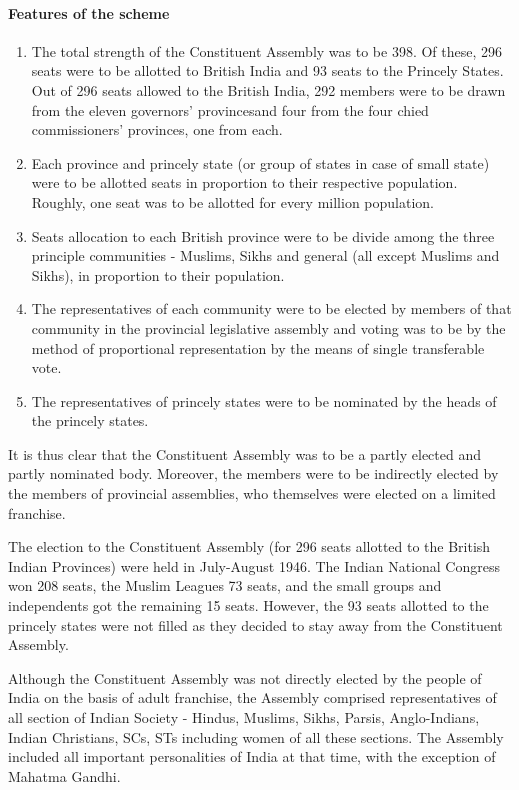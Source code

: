 \begin{multicol}{2}
\paragraph{Features of the scheme}
\begin{enumerate}
  \item The total strength of the Constituent Assembly was to be 398. Of these, 296 seats were to be allotted to British India and 93 seats to the Princely States. Out of 296 seats allowed to the British India, 292 members were to be drawn from the eleven governors' provinces\endnote and four from the four chied commissioners' provinces\endnote, one from each.
  \item Each province and princely state (or group of states in case of small state) were to be allotted seats in proportion to their respective population. Roughly, one seat was to be allotted for every million population.
  \item Seats allocation to each British province were to be divide among the three principle communities - Muslims, Sikhs and general (all except Muslims and Sikhs), in proportion to their population.
  \item The representatives of each community were to be elected by members of that community in the provincial legislative assembly and voting was to be by the method of proportional representation by the means of single transferable vote.
  \item The representatives of princely states were to be nominated by the heads of the princely states.
\end{enumerate}

It is thus clear that the Constituent Assembly was to be a partly elected and partly nominated body. Moreover, the members were to be indirectly elected by the members of provincial assemblies, who themselves were elected on a limited franchise\endnote.

The election to the Constituent Assembly (for 296 seats allotted to the British Indian Provinces) were held in July-August 1946. The Indian National Congress won 208 seats, the Muslim Leagues 73 seats, and the small groups and independents got the remaining 15 seats. However, the 93 seats allotted to the princely states were not filled as they decided to stay away from the Constituent Assembly.

Although the Constituent Assembly was not directly elected by the people of India on the basis of adult franchise, the Assembly comprised representatives of all section of Indian Society - Hindus, Muslims, Sikhs, Parsis, Anglo-Indians, Indian Christians, SCs, STs including women of all these sections. The Assembly included all important personalities of India at that time, with the exception of Mahatma Gandhi.


\end{multicol}

